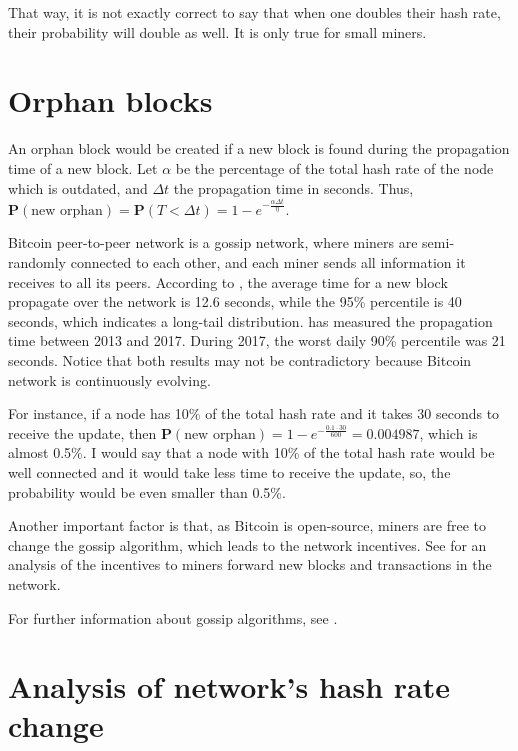 That way, it is not exactly correct to say that when one doubles their hash rate, their probability will double as well. It is only true for small miners.


\section{Orphan blocks}
An orphan block would be created if a new block is found during the propagation time of a new block. Let $\alpha$ be the percentage of the total hash rate of the node which is outdated, and $\Delta t$ the propagation time in seconds. Thus, $\mathbf{P}(\text{new orphan}) = \mathbf{P}(T < \Delta t) = 1 - e^{-\frac{\alpha \Delta t}{\eta}}$.

Bitcoin peer-to-peer network is a gossip network, where miners are semi-randomly connected to each other, and each miner sends all information it receives to all its peers. According to \citet{decker2013information}, the average time for a new block propagate over the network is 12.6 seconds, while the 95\% percentile is 40 seconds, which indicates a long-tail distribution. \citet{bitcoinstats} has measured the propagation time between 2013 and 2017. During 2017, the worst daily 90\% percentile was 21 seconds. Notice that both results may not be contradictory because Bitcoin network is continuously evolving.

For instance, if a node has 10\% of the total hash rate and it takes 30 seconds to receive the update, then $\mathbf{P}(\text{new orphan}) = 1 - e^{-\frac{0.1 \cdot 30}{600}} = 0.004987$, which is almost 0.5\%. I would say that a node with 10\% of the total hash rate would be well connected and it would take less time to receive the update, so, the probability would be even smaller than 0.5\%.

Another important factor is that, as Bitcoin is open-source, miners are free to change the gossip algorithm, which leads to the network incentives. See \citet{babaioff2012bitcoin} for an analysis of the incentives to miners forward new blocks and transactions in the network.

For further information about gossip algorithms, see \citet{shah2009gossip}.


\section{Analysis of network's hash rate change}

